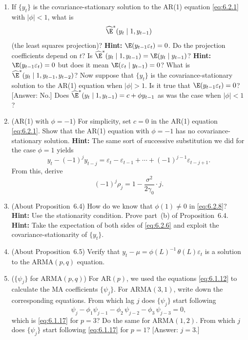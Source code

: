 \begin{enumerate}
\item If $\{y_t\}$ is the covariance-stationary solution to the AR(1) equation \eqref{eq:6.2.1} with
$|\phi| < 1$, what is
\[
  \widehat{\E}^*(y_t \mid 1, y_{t-1})
\]
(the least squares projection)? \textbf{Hint:} $\E(y_{t-1} \varepsilon_t) = 0$. Do the projection coefficients
depend on $t$? Is $\widehat{\E}^*(y_t \mid 1, y_{t-1}) = \E(y_t \mid y_{t-1})$? \textbf{Hint:} $\E(y_{t-1} \varepsilon_t) = 0$
but does it mean $\E(\varepsilon_t \mid y_{t-1}) = 0$? What is $\widehat{\E}^*(y_t \mid 1, y_{t-1}, y_{t-2})$? Now
suppose that $\{y_t\}$ is the covariance-stationary solution to the AR(1) equation
when $|\phi| > 1$. Is it true that $\E(y_{t-1} \varepsilon_t) = 0$? [Answer: No.] Does $\widehat{\E}^*(y_t \mid
1, y_{t-1}) = c + \phi y_{t-1}$ as was the case when $|\phi| < 1$?

\item (AR(1) with $\phi = -1$) \; For simplicity, set $c = 0$ in the AR(1) equation \eqref{eq:6.2.1}.
Show that the AR(1) equation with $\phi = -1$ has no covariance-stationary solution.
\textbf{Hint:} The same sort of successive substitution we did for the case $\phi = 1$
yields
\[
  y_t - (-1)^j y_{t-j} = \varepsilon_t - \varepsilon_{t-1} + \cdots + (-1)^{j-1} \varepsilon_{t-j+1}.
\]
From this, derive
\[
  (-1)^j \rho_j = 1 - \frac{\sigma^2}{2\gamma_0} \cdot j.
\]

\item (About Proposition~6.4) \; How do we know that $\phi(1) \neq 0$ in \eqref{eq:6.2.8}?
\textbf{Hint:} Use the stationarity condition. Prove part~(b) of Proposition~6.4. \textbf{Hint:} Take the expectation
of both sides of \eqref{eq:6.2.6} and exploit the covariance-stationarity of $\{y_t\}$.

\item (About Proposition~6.5) \; Verify that $y_t - \mu = \phi(L)^{-1}\,\theta(L) \varepsilon_t$ is a solution to
the $\text{ARMA}(p, q)$ equation.

\item ($\{\psi_j\}$ for $\text{ARMA}(p, q)$) \; For $\text{AR}(p)$, we used the equations \eqref{eq:6.1.12} to calculate
the MA coefficients $\{\psi_j\}$. For $\text{ARMA}(3, 1)$, write down the corresponding
equations. From which lag $j$ does $\{\psi_j\}$ start following
\[
  \psi_j - \phi_1 \psi_{j-1} - \phi_2\,\psi_{j-2} - \phi_3\,\psi_{j-3} = 0,
\]
which is \eqref{eq:6.1.17} for $p = 3$? Do the same for $\text{ARMA}(1, 2)$. From which $j$
does $\{\psi_j\}$ start following \eqref{eq:6.1.17} for $p = 1$? [Answer: $j = 3$.]


\end{enumerate}
